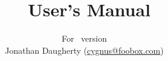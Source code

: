 \title{\vtyui\ User's Manual}
\author{
  For \vtyui\ version \vtyuiversion\\
  Jonathan Daugherty (\href{mailto:cygnus@foobox.com}{cygnus@foobox.com})
}
\maketitle
